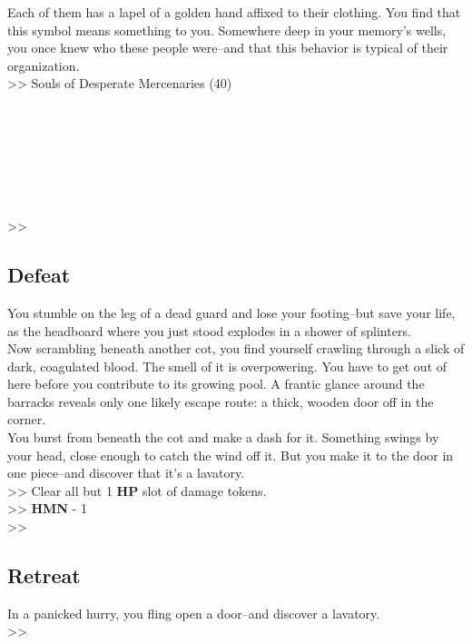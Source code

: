 Each of them has a lapel of a golden hand affixed to their clothing. You find that this symbol means something to you. Somewhere deep in your memory’s wells, you once knew who these people were--and that this behavior is typical of their organization.\\

>> Souls of Desperate Mercenaries (40)\\
\\
\\
\\
\\
\\
\\
\\
>> 

\subsection*{Defeat}
You stumble on the leg of a dead guard and lose your footing--but save your life, as the headboard where you just stood explodes in a shower of splinters.\\

Now scrambling beneath another cot, you find yourself crawling through a slick of dark, coagulated blood. The smell of it is overpowering. You have to get out of here before you contribute to its growing pool. A frantic glance around the barracks reveals only one likely escape route: a thick, wooden door off in the corner.\\

You burst from beneath the cot and make a dash for it. Something swings by your head, close enough to catch the wind off it. But you make it to the door in one piece--and discover that it’s a lavatory.\\

>> Clear all but 1 \textbf{HP} slot of damage tokens.\\
>> \textbf{HMN} - 1\\
>> 

\subsection*{Retreat}
In a panicked hurry, you fling open a door--and discover a lavatory.\\

>> 